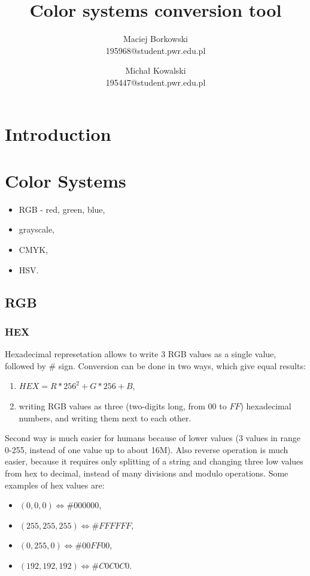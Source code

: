 \documentclass[titlepage]{article}
\title{Color systems conversion tool}
\author{Maciej Borkowski\\ 195968@student.pwr.edu.pl \and Michał Kowalski \\ 195447@student.pwr.edu.pl}
\date{}
\begin{document}
\maketitle
\section{Introduction}

\section{Color Systems}

\begin{itemize}
  \item RGB - red, green, blue,
  \item grayscale,
  \item CMYK,
  \item HSV.
\end{itemize}

\subsection{RGB}

\subsubsection{HEX}
Hexadecimal represetation allows to write 3 RGB values as a single value,
followed by \# sign. Conversion can be done in two ways, which give equal
results:
\begin{enumerate}
  \item $HEX=R*256^2+G*256+B$,
  \item writing RGB values as three (two-digits long, from $00$ to $FF$)
  hexadecimal numbers, and writing them next to each other.
\end{enumerate}
Second way is much easier for humans because of lower values (3 values in
range 0-255, instead of one value up to about 16M). Also reverse operation
is much easier, because it requires only splitting of a string and changing
three low values from hex to decimal, instead of many divisions and modulo
operations. Some examples of hex values are:
\begin{itemize}
  \item $(0, 0, 0) \Leftrightarrow \#000000$,
  \item $(255, 255, 255) \Leftrightarrow \#FFFFFF$,
  \item $(0, 255, 0) \Leftrightarrow \#00FF00$,
  \item $(192, 192, 192) \Leftrightarrow \#C0C0C0$.
\end{itemize}
\end{document}
